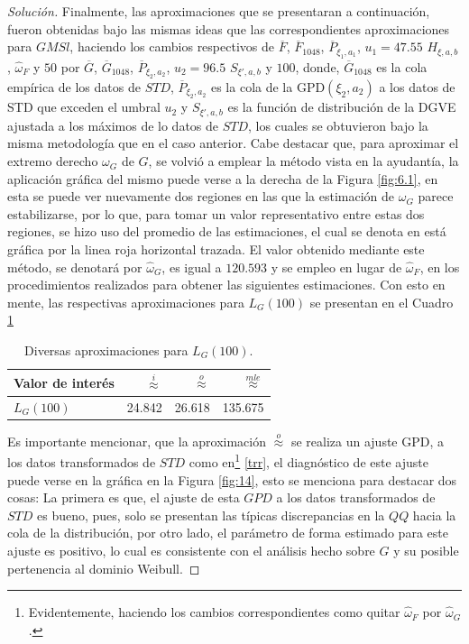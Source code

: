 \documentclass[10.5pt,notitlepage]{article}
\newenvironment{solucion}
  {\begin{proof}[Solución]}
  {\end{proof}}
\newcommand{\approxi}{\overset{i}{\approx}}
\theoremstyle{plain}
\begin{document}
\begin{solucion}
Finalmente, las aproximaciones que se presentaran a continuación, fueron obtenidas bajo las mismas ideas que las correspondientes aproximaciones para \(GMSl\), haciendo los cambios respectivos de \(\overline{F}\), \(\overline{F}_{1048}\), \(\overline{P}_{\xi_1,a_1}\), \(u_1 = 47.55\) \(H_{\xi,a,b}\), \(\hat{\omega}_F\)  y \(50\) por  \(\overline{G}\), \(\overline{G}_{1048}\), \(\overline{P}_{\xi_2,a_2}\), \(u_2 = 96.5\) \(S_{\xi',a,b}\) y \(100\), donde, \(\overline{G}_{1048}\) es la cola empírica de los datos de \(STD\), \(\overline{P}_{\xi_2,a_2}\) es la cola de la GPD\((\xi_2,a_2)\) a los datos de STD que exceden el umbral \(u_2\) y \(S_{\xi',a,b}\) es la función de distribución de la DGVE ajustada a los máximos de lo datos de \(STD\), los cuales se obtuvieron bajo la misma metodología que en el caso anterior. Cabe destacar que, para aproximar el extremo derecho \(\omega_{G}\) de  \(G\), se volvió a emplear la método vista en la ayudantía, la aplicación gráfica del mismo puede verse a la derecha de la Figura \ref{fig:6.1}, en esta se puede ver nuevamente dos regiones en las que la estimación de \(\omega_{G}\) parece estabilizarse, por lo que, para tomar un valor representativo entre estas dos regiones, se hizo uso del promedio de las estimaciones, el cual se denota en está gráfica por la linea roja horizontal trazada. El valor obtenido mediante este método, se denotará por \(\hat{\omega}_{G}\), es igual a \(120.593\) y se empleo en lugar de \(\hat{\omega}_{F}\), en los procedimientos realizados para obtener las siguientes estimaciones. Con esto en mente, las respectivas aproximaciones para \(L_{G}(100)\) se presentan en el Cuadro \ref{tab:2}
\begin{table}[H]
        \centering
        \begin{tabular}{@{}l@{\hskip 0.3in}r@{\hskip 0.3in}r@{\hskip 0.3in}r@{}}
        \toprule
         Valor de interés & \(\approxi\) & \(\overset{o}{\approx}\) & \(\overset{mle}{\approx}\)\\
        \midrule         
        \(L_{G}(100)\)&24.842& 26.618 &135.675\\
        \end{tabular}
        \caption{Diversas aproximaciones para \(L_{G}(100)\).}
        \label{tab:2}
\end{table} 
Es importante mencionar, que la aproximación \(\overset{o}{\approx}\) se realiza un ajuste GPD, a los datos transformados de \(STD\) como en\footnote{Evidentemente, haciendo los cambios correspondientes como quitar \(\hat{\omega}_{F}\) por \(\hat{\omega}_G\).} \eqref{trr}, el diagnóstico de este ajuste puede verse en la gráfica en la Figura \ref{fig:14}, esto se menciona para destacar dos cosas: La primera es que, el ajuste de esta \(GPD\) a los datos transformados de \(STD\) es bueno, pues, solo se presentan las típicas discrepancias en la \(QQ\) hacia la cola de la distribución, por otro lado, el parámetro de forma estimado para este ajuste es positivo, lo cual es consistente con el análisis hecho sobre \(G\) y su posible pertenencia al dominio Weibull. 



\end{solucion}
\end{document}
